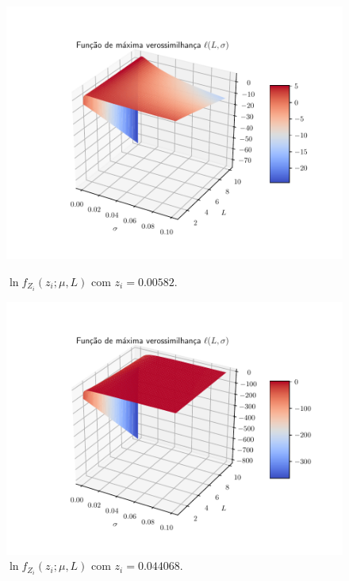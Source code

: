 \documentclass[journal,article,submit,moreauthors,pdftex]{Definitions/mdpi}
\begin{document}
\begin{figure}[hbt]
  \includegraphics[width=\linewidth]{funv_max_ver_j_30_flevoland.pdf}
  	\caption{$\ln f_{Z_{i}}(z_{i};\mu,L)$ com $z_i=0.00582$.}\label{funv_max_ver_j_30_flevoland}
\endminipage\hfill
{}
  \includegraphics[width=\linewidth]{funv_max_ver_j_40_flevoland.pdf}
		\caption{$\ln f_{Z_{i}}(z_{i};\mu,L)$ com $z_i=0.044068$.}\label{funv_max_ver_j_40_flevoland}
\endminipage\hfill
\end{figure}
\end{document}
